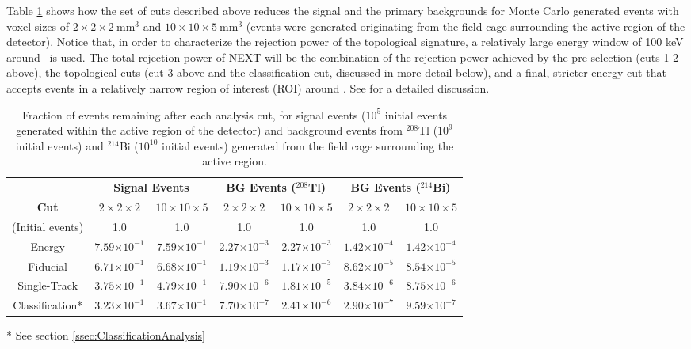 \documentclass[a4paper,11pt]{article}
\begin{document}
Table \ref{tbl.FastAnalysisResults} shows how the set of cuts described above reduces the signal and the primary backgrounds for Monte Carlo generated events with voxel sizes of $2 \times 2 \times 2 \mathrm{~mm^3}$ and $10 \times 10 \times 5 \mathrm{~mm^3}$ (events were generated originating from the field cage surrounding the active region of the detector).  Notice that, in order to characterize the rejection power of the topological signature, a relatively large energy window of 100 keV around \Qbb\ is used. The total rejection power of NEXT will be the combination of the rejection power achieved by the pre-selection (cuts 1-2 above), the topological cuts (cut 3 above and the classification cut, discussed in more detail below), and a final, stricter energy cut that accepts events in a relatively narrow region of interest (ROI) around \Qbb. See \cite{Martin-Albo:2015rhw} for a detailed discussion.

\begin{table}[!htb]
	\begin{center}
		\caption[Fast analysis summary]{\label{tbl.FastAnalysisResults}Fraction of events remaining after each analysis cut, for signal events ($10^5$ initial events generated within the active region of the detector) and background events from $^{208}$Tl ($10^{9}$ initial events) and $^{214}$Bi ($10^{10}$ initial events) generated from the field cage surrounding the active region.}
		\begin{tabular}{c|cc|cc|cc}
			\\
			 & \multicolumn{2}{c}{\textbf{Signal Events}} & \multicolumn{2}{c}{\textbf{BG Events ($^{208}$Tl)}} & \multicolumn{2}{c}{\textbf{BG Events ($^{214}$Bi)}}\\
			\textbf{Cut} & $2 \times 2 \times 2$ & $10 \times 10 \times 5$ & $2 \times 2 \times 2$ & $10 \times 10 \times 5$ & $2 \times 2 \times 2$ & $10 \times 10 \times 5$\\
			\hline
			(Initial events) & 1.0 & 1.0 & 1.0 & 1.0 & 1.0 & 1.0\\
			Energy & $7.59$\small{$\times 10^{-1}$} & $7.59$\small{$\times 10^{-1}$} & $2.27$\small{$\times 10^{-3}$} & $2.27$\small{$\times 10^{-3}$} & $1.42$\small{$\times 10^{-4}$} & $1.42$\small{$\times 10^{-4}$}\\
			Fiducial & $6.71$\small{$\times 10^{-1}$} & $6.68$\small{$\times 10^{-1}$} & $1.19$\small{$\times 10^{-3}$} & $1.17$\small{$\times 10^{-3}$} & $8.62$\small{$\times 10^{-5}$} & $8.54$\small{$\times 10^{-5}$}\\
			Single-Track & $3.75$\small{$\times 10^{-1}$} & $4.79$\small{$\times 10^{-1}$} & $7.90$\small{$\times 10^{-6}$} & $1.81$\small{$\times 10^{-5}$} & $3.84$\small{$\times 10^{-6}$} & $8.75$\small{$\times 10^{-6}$}\\
			Classification* & $3.23$\small{$\times 10^{-1}$} & $3.67$\small{$\times 10^{-1}$} & $7.70$\small{$\times 10^{-7}$} & $2.41$\small{$\times 10^{-6}$} & $2.90$\small{$\times 10^{-7}$} & $9.59$\small{$\times 10^{-7}$}\\
		\end{tabular}
	\end{center}
	* See section \ref{ssec:ClassificationAnalysis}
\end{table}
\end{document}
